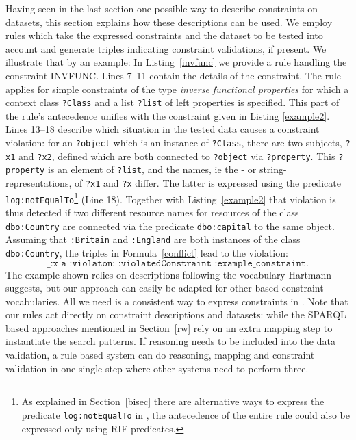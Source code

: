 Having seen in the last section one possible way to describe constraints on \rdf datasets, this section explains how these descriptions can be used. We employ rules
which take the expressed constraints and the \rdf dataset to be tested into account and generate triples indicating constraint validations, if present. 
We illustrate that by an example: In  Listing~\ref{invfunc} we provide a rule handling the constraint INVFUNC. Lines 7--11 contain the details of the constraint. The rule
applies for simple constraints of the type \emph{inverse functional properties} for which a context class \texttt{?Class} and a list \texttt{?list} of left properties 
is specified.
This part of the rule's antecedence unifies with the constraint given in Listing \ref{example2}. Lines 13--18 describe which situation in the tested data causes 
a constraint violation: for an \texttt{?object} which is an instance of \texttt{?Class}, there are two subjects, \texttt{?x1} and \texttt{?x2}, defined 
which are both connected 
to \texttt{?object} via \texttt{?property}. This \texttt{?property} is an element of \texttt{?list},
and the names, ie the \uri- or string-representations, of \texttt{?x1} and \texttt{?x} differ. The latter is expressed using the predicate
\texttt{log:notEqualTo}\footnote{As explained in Section~\ref{bisec} 
there are alternative ways to express the predicate \texttt{log:notEqualTo} in \nthree, the antecedence of the entire rule could also be expressed only using RIF predicates.} 
(Line 18). Together with Listing~\ref{example2} that violation is thus detected if two different resource names 
for resources of the class \texttt{dbo:Country} are connected via the predicate \texttt{dbo:capital} to the same object. Assuming that \texttt{:Britain} and \texttt{:England}
are both instances of the class \texttt{dbo:Country}, the triples in Formula~\ref{conflict} lead to the violation:
\begin{equation}
 \texttt{\_:x a :violaton; :violatedConstraint :example\_constraint.}
\end{equation}
The example shown relies on descriptions following the vocabulary Hartmann suggests, but our approach can easily be adapted for 
other \rdf based constraint vocabularies. All  we need is a consistent way to express constraints in \rdf. 
Note that our rules act directly on constraint descriptions and \rdf datasets: while the SPARQL based approaches \cite{hartmann2016,kontokostas2014test} mentioned 
in Section~\ref{rw} rely on an extra mapping step
to instantiate the search patterns. If reasoning needs to be included into the data validation, a rule based system can do reasoning, mapping and constraint validation 
in one single step  where other systems need to perform three.


